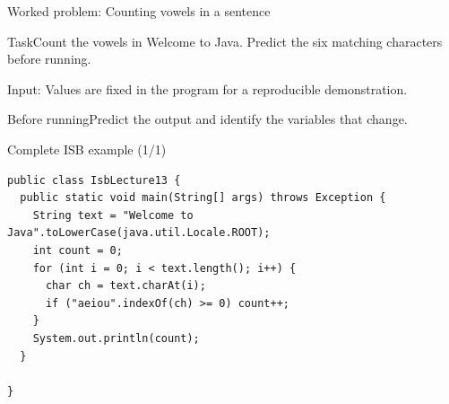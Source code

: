 \documentclass[10pt,aspectratio=169]{beamer}
\begin{document}
\begin{frame}[fragile,t]{Worked problem: Counting vowels in a sentence}
\begin{block}{Task}Count the vowels in Welcome to Java. Predict the six matching characters before running.\end{block}
\small Input: Values are fixed in the program for a reproducible demonstration.\par\vspace{3mm}\begin{exampleblock}{Before running}Predict the output and identify the variables that change.\end{exampleblock}
\end{frame}

\begin{frame}[fragile,t]{Complete ISB example (1/1)}
\begin{lstlisting}
public class IsbLecture13 {
  public static void main(String[] args) throws Exception {
    String text = "Welcome to Java".toLowerCase(java.util.Locale.ROOT);
    int count = 0;
    for (int i = 0; i < text.length(); i++) {
      char ch = text.charAt(i);
      if ("aeiou".indexOf(ch) >= 0) count++;
    }
    System.out.println(count);
  }

}
\end{lstlisting}
\end{frame}
\end{document}
